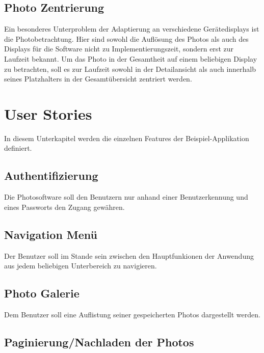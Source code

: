 \subsection{Photo Zentrierung}
\label{sec:spec:photo_centering}

Ein besonderes Unterproblem der Adaptierung an verschiedene Gerätedisplays ist die Photobetrachtung. Hier sind sowohl die Auflösung des Photos als auch des Displays für die Software nicht zu Implementierungszeit, sondern erst zur Laufzeit bekannt. Um das Photo in der Gesamtheit auf einem beliebigen Display zu betrachten, soll es zur Laufzeit sowohl in der Detailansicht als auch innerhalb seines Platzhalters in der Gesamtübersicht zentriert werden.

\section{User Stories}

In diesem Unterkapitel werden die einzelnen Features der Beispiel-Applikation definiert.

\subsection{Authentifizierung}
\label{sec:spec:authentication}

Die Photosoftware soll den Benutzern nur anhand einer Benutzerkennung und eines Passworts den Zugang gewähren.

\subsection{Navigation Menü}
\label{sec:spec:menu}

Der Benutzer soll im Stande sein zwischen den Hauptfunkionen der Anwendung aus jedem beliebigen Unterbereich zu navigieren.

\subsection{Photo Galerie}
\label{sec:spec:photo_gallery}

Dem Benutzer soll eine Auflistung seiner gespeicherten Photos dargestellt werden.

\subsection{Paginierung/Nachladen der Photos}
\label{sec:spec:pagination}

